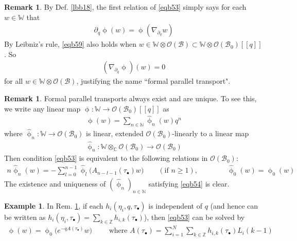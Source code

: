 \documentclass[11pt,b5paper,notitlepage]{article}
\theoremstyle{definition}
\newtheorem{eg}[df]{Example}
\newtheorem{rem}[df]{Remark}
\theoremstyle{plain}
\newcommand{\mc}{\mathcal}
\newcommand{\wht}{\widehat}
\newcommand{\blt}{\bullet}
\newcommand{\Wbb}{\mathbb W}
\newcommand{\Cbb}{\mathbb C}
\newcommand{\Nbb}{\mathbb N}
\newcommand{\Zbb}{\mathbb Z}
\newcommand{\<}{\left\langle}
\renewcommand{\>}{\right\rangle}
\newcommand{\MB}{\mathcal{B}}
\numberwithin{equation}{subsection}
\begin{document}
\begin{rem}\label{lbb24}
By Def. \ref{lbb18}, the first relation of \eqref{eqb53} simply says for each $w\in\Wbb$ that 
\begin{align}\label{eqb59}
\partial_q\upphi(w)=\upphi(\nabla_{\partial_q}w)
\end{align}
By Leibniz's rule, \eqref{eqb59} also holds when $w\in \Wbb\otimes\mc O(\MB)\subset\Wbb\otimes\mc O(\MB_0)[[q]]$. So
\begin{align*}
(\nabla_{\partial_q}\upphi)(w)=0
\end{align*}
for all $w\in \Wbb\otimes\mc O(\MB)$, justifying the name ``formal parallel transport".
\end{rem}


\begin{rem}\label{lbb23}
Formal parallel transports always exist and are unique. To see this, we write any linear map $\upphi:\Wbb\rightarrow\mc O(\MB_0)[[q]]$ as
\begin{align*}
\upphi(w)=\sum_{n\in\Nbb}\wht\upphi_n(w)q^n
\end{align*}
where $\wht\upphi_n:\Wbb\rightarrow\mc O(\MB_0)$ is linear, extended $\mc O(\MB_0)$-linearly to a linear map
\begin{align*}
\wht\upphi_n:\Wbb\otimes_\Cbb\mc O(\MB_0)\rightarrow\mc O(\MB_0)
\end{align*}
Then condition \eqref{eqb53} is equivalent to the following relations in $\mc O(\MB_0)$:
\begin{align}\label{eqb54}
 n\wht\upphi_n(w) =-\sum_{l=0}^{n-1} \wht\upphi_l\big( A_{n-l-1}(\tau_\blt)w\big)\qquad(\text{if }n\geq 1),\qquad\qquad \wht\upphi_0(w)=\upphi_0(w)
\end{align}
The existence and uniqueness of $(\wht\upphi_n)_{n\in\Nbb}$ satisfying \eqref{eqb54} is clear. 
\end{rem}



\begin{eg}\label{lbb32}
In Rem. \ref{lbb23}, if each $h_i(\eta_i,q,\tau_\blt)$ is independent of $q$ (and hence can be written as $h_i(\eta_i,\tau_\blt)=\sum_{k\in\Zbb}h_{i,k}(\tau_\blt)$), then \eqref{eqb53} can be solved by
\begin{align}\label{eqb64}
\upphi(w)=\upphi_0\big(e^{-qA(\tau_\blt)}w\big)\qquad\text{ where } A(\tau_\blt)=\sum_{i=1}^N \sum_{k\in\Zbb}h_{i,k}(\tau_\blt)L_i(k-1)
\end{align} 
\end{eg}
\end{document}
